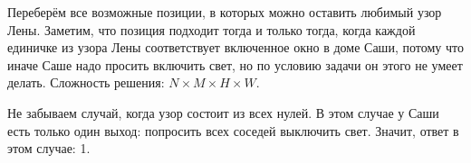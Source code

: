 \solutionSection

Переберём все возможные позиции, в которых можно оставить любимый узор Лены. Заметим, что позиция подходит тогда и только тогда, когда каждой единичке из узора Лены соответствует включенное окно в доме Саши, потому что иначе Саше надо просить включить свет, но по условию задачи он этого не умеет делать. Сложность решения: $N \times M \times H \times W$.

Не забываем случай, когда узор состоит из всех нулей. В этом случае у Саши есть только один выход: попросить всех соседей выключить свет. Значит, ответ в этом случае: 1.

\codeExample

